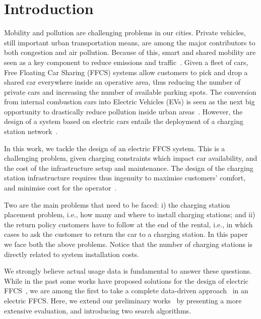 \section{Introduction}
\label{sec:intro}


Mobility and pollution are challenging problems in our cities. Private vehicles, still  important urban transportation means, are among the major contributors to both congestion and air pollution. Because of this, smart and shared mobility are seen as a key component to reduce emissions and traffic~\cite{Firnkorn2011}.
Given a fleet of cars, Free Floating Car Sharing (FFCS) systems allow customers to pick and drop a shared car everywhere inside an operative area, thus reducing the number of private cars and increasing the number of available parking spots.
The conversion from internal combustion cars into Electric Vehicles (EVs) is seen as the next big opportunity to drastically reduce pollution inside urban areas~\cite{FM15}. However, the design of a system based on electric cars entails the deployment of a charging station network~\cite{plugPowers}.


In this work, we tackle the design of an electric FFCS system.
This is a challenging problem, given charging constraints which impact car availability, and the cost of the infrastructure setup and maintenance.
The design of the charging station infrastructure requires thus ingenuity to maximise customers' comfort, and minimise cost for the operator~\cite{PlacementAndPowergrid,placementAustin,mipCSPpechino}. 

Two are the main problems that need to be faced: i) the charging station placement problem, i.e., how many and where to install charging stations; and ii) the return policy customers have to follow at the end of the rental, i.e., in which cases to ask the customer to return the car to a charging station.
In this paper we face both the above problems. Notice that the number of charging stations is directly related to system installation costs.

We strongly believe actual usage data is fundamental to answer these questions. While in the past some works have proposed solutions for the design of electric FFCS~\cite{FM15,WB15}, we are among the first to take a complete data-driven approach~\cite{PlacementAndPowergrid,placementAustin,mipCSPpechino,ChargingStationForVehicularNetworks,3_RickenbergGebhardtBreitner_2013,5_SonnebergKune_2015} in an electric FFCS. Here, we extend our preliminary works~\cite{taormina, maui} by presenting a more extensive evaluation, and introducing two search algorithms.

